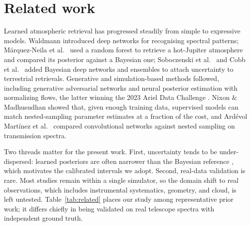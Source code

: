 \documentclass[11pt,twocolumn]{article}
\newcommand{\citep}[1]{\cite{#1}}
\begin{document}
\section{Related work}

Learned atmospheric retrieval has progressed steadily from simple to expressive
models. Waldmann \citep{waldmann2016} introduced deep networks for recognising
spectral patterns; M\'arquez-Neila et al.\ \citep{marquez2018} used a random
forest to retrieve a hot-Jupiter atmosphere and compared its posterior against a
Bayesian one; Soboczenski et al.\ \citep{soboczenski2018} and Cobb et al.\
\citep{cobb2019} added Bayesian deep networks and ensembles to attach
uncertainty to terrestrial retrievals. Generative and simulation-based methods
followed, including generative adversarial networks \citep{zingales2018} and
neural posterior estimation with normalizing flows, the latter winning the 2023
Ariel Data Challenge \citep{vasist2023,aubin2023}. Nixon \& Madhusudhan
\citep{nixon2020} showed that, given enough training data, supervised models can
match nested-sampling parameter estimates at a fraction of the cost, and
Ard\'evol Mart\'inez et al.\ \citep{ardevol2022} compared convolutional networks
against nested sampling on transmission spectra.

Two threads matter for the present work. First, uncertainty tends to be
under-dispersed: learned posteriors are often narrower than the Bayesian
reference \citep{marquez2018}, which motivates the calibrated intervals we adopt.
Second, real-data validation is rare. Most studies remain within a single
simulator, so the domain shift to real observations, which includes instrumental
systematics, geometry, and cloud, is left untested. Table~\ref{tab:related}
places our study among representative prior work; it differs chiefly in being
validated on real telescope spectra with independent ground truth.
\end{document}
